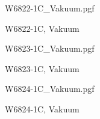 \begin{figure}
    \centering
    {W6822-1C_Vakuum.pgf}
    \caption{W6822-1C, Vakuum}
    \label{fig: XRD, W6822-1C, Vakuum}
\end{figure}

\begin{figure}
    \centering
    {W6823-1C_Vakuum.pgf}
    \caption{W6823-1C, Vakuum}
    \label{fig: XRD, W6823-1C, Vakuum}
\end{figure}

\begin{figure}
    \centering
    {W6824-1C_Vakuum.pgf}
    \caption{W6824-1C, Vakuum}
    \label{fig: XRD, W6824-1C, Vakuum}
\end{figure}

